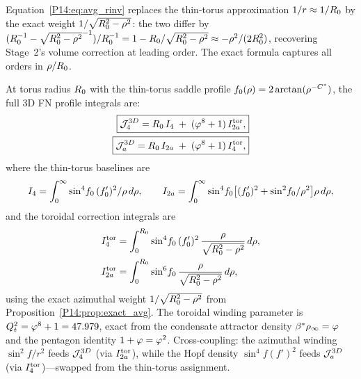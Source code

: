 \begin{remark}
\label{P14:rem:avg_rinv_meaning}
Equation~\eqref{P14:eq:avg_rinv} replaces the thin-torus approximation
$1/r\approx1/R_0$ by the exact weight $1/\sqrt{R_0^2-\rho^2}$:
the two differ by $(R_0^{-1}-\sqrt{R_0^2-\rho^2}^{-1})/R_0^{-1}
= 1-R_0/\sqrt{R_0^2-\rho^2}\approx-\rho^2/(2R_0^2)$,
recovering Stage~2's volume correction at leading order.
The exact formula captures all orders in $\rho/R_0$.
\end{remark}

\begin{theorem}
\label{P14:thm:toroidal_formula}
At torus radius $R_0$ with the thin-torus saddle profile
$f_0(\rho)=2\arctan(\rho^{-C^*})$, the full 3D FN profile
integrals are:
\begin{align}
  \boxed{\mathcal{J}_4^{3D}
  = R_0\,I_4 \;+\; (\varphi^8+1)\,I_{2a}^{\mathrm{tor}},}
  \label{P14:eq:J4_3D}\\
  \boxed{\mathcal{J}_a^{3D}
  = R_0\,I_{2a} \;+\; (\varphi^8+1)\,I_{4}^{\mathrm{tor}},}
  \label{P14:eq:J2a_3D}
\end{align}
where the thin-torus baselines are
\begin{equation}
  I_4 = \int_0^\infty \sin^4\!f_0\,(f_0')^2/\rho\,d\rho,
  \qquad
  I_{2a} = \int_0^\infty \sin^4\!f_0\bigl[(f_0')^2+\sin^2\!f_0/\rho^2\bigr]\rho\,d\rho,
\end{equation}
and the toroidal correction integrals are
\begin{align}
  I_{4}^{\mathrm{tor}}
  &= \int_0^{R_0} \sin^4\!f_0\,(f_0')^2\,
     \frac{\rho}{\sqrt{R_0^2-\rho^2}}\,d\rho,
  \label{P14:eq:I4tor}\\
  I_{2a}^{\mathrm{tor}}
  &= \int_0^{R_0} \sin^6\!f_0\,
     \frac{\rho}{\sqrt{R_0^2-\rho^2}}\,d\rho,
  \label{P14:eq:I2ator}
\end{align}
using the exact azimuthal weight $1/\sqrt{R_0^2-\rho^2}$
from Proposition~\ref{P14:prop:exact_avg}.
The toroidal winding parameter is $Q_t^2=\varphi^8+1=47.979$,
exact from the condensate attractor density $\beta^{*}\rho_\infty=\varphi$
and the pentagon identity $1+\varphi=\varphi^2$.
Cross-coupling: the azimuthal winding $\sin^2\!f/r^2$ feeds
$\mathcal{J}_4^{3D}$ (via $I_{2a}^{\mathrm{tor}}$), while the Hopf density
$\sin^4\!f(f')^2$ feeds $\mathcal{J}_a^{3D}$ (via $I_{4}^{\mathrm{tor}}$)---swapped
from the thin-torus assignment.
\end{theorem}

